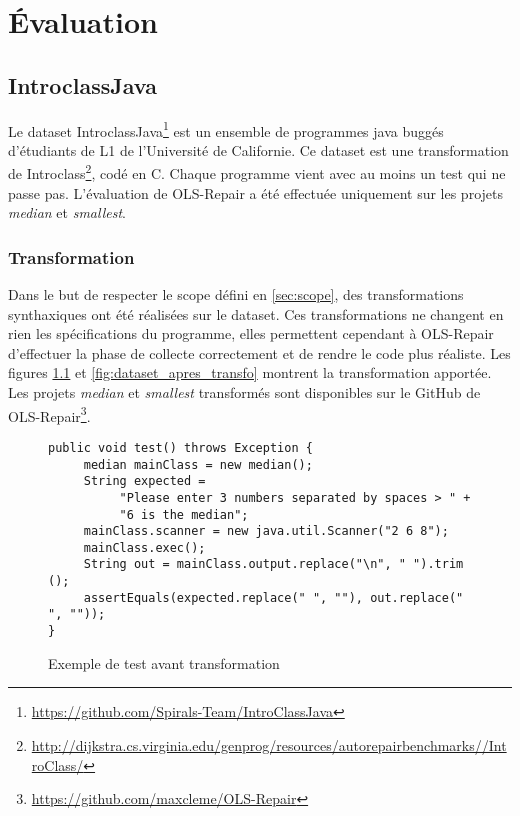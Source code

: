 
\chapter{Évaluation}
	\thispagestyle{document}

\section{IntroclassJava}

Le dataset IntroclassJava\footnote{\url{https://github.com/Spirals-Team/IntroClassJava}} est un ensemble de programmes java buggés d'étudiants de L1 de l'Université de Californie. Ce dataset est une transformation de Introclass\footnote{\url{http://dijkstra.cs.virginia.edu/genprog/resources/autorepairbenchmarks//IntroClass/}}, codé en C. Chaque programme vient avec au moins un test qui ne passe pas. L'évaluation de OLS-Repair a été effectuée uniquement sur les projets \textit{median} et \textit{smallest}.

\subsection{Transformation}

Dans le but de respecter le scope défini en \ref{sec:scope}, des transformations synthaxiques ont été réalisées sur le dataset. Ces transformations ne changent en rien les spécifications du programme, elles permettent cependant à OLS-Repair d'effectuer la phase de collecte correctement et de rendre le code plus réaliste. Les figures \ref{fig:dataset_avant_transfo} et  \ref{fig:dataset_apres_transfo} montrent la transformation apportée. Les projets \textit{median} et \textit{smallest} transformés sont disponibles sur le GitHub de OLS-Repair\footnote{\url{https://github.com/maxcleme/OLS-Repair}}.



\begin{figure}
\begin{lstlisting}
public void test() throws Exception {
     median mainClass = new median();
     String expected =
          "Please enter 3 numbers separated by spaces > " + 
          "6 is the median";
     mainClass.scanner = new java.util.Scanner("2 6 8");
     mainClass.exec();
     String out = mainClass.output.replace("\n", " ").trim ();
     assertEquals(expected.replace(" ", ""), out.replace(" ", ""));
}
\end{lstlisting}
\label{fig:dataset_avant_transfo}
\caption{Exemple de test avant transformation}
\end{figure}


